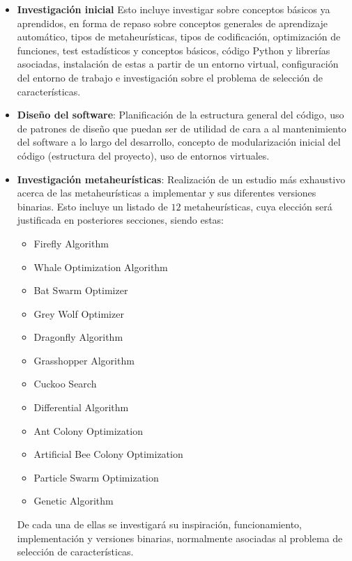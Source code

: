 \begin{itemize}
      \item \textbf{Investigación inicial}
            Esto incluye investigar sobre conceptos básicos ya aprendidos, en forma de repaso sobre conceptos generales de aprendizaje automático, tipos de metaheurísticas, tipos de codificación, optimización de funciones, test estadísticos y conceptos básicos, código Python y librerías asociadas, instalación de estas a partir de un entorno virtual, configuración del entorno de trabajo e investigación sobre el problema de selección de características.

      \item \textbf{Diseño del software}: Planificación de la estructura general del código, uso de patrones de diseño que puedan ser de utilidad de cara a al mantenimiento del software a lo largo del desarrollo, concepto de modularización inicial del código (estructura del proyecto), uso de entornos virtuales.
      \item \textbf{Investigación metaheurísticas}: Realización de un estudio más exhaustivo acerca de las metaheurísticas a implementar y sus diferentes versiones binarias. Esto incluye un listado de $12$ metaheurísticas, cuya elección será justificada en posteriores secciones, siendo estas:
            \begin{itemize}
                  \item Firefly Algorithm
                  \item Whale Optimization Algorithm
                  \item Bat Swarm Optimizer
                  \item Grey Wolf Optimizer
                  \item Dragonfly Algorithm
                  \item Grasshopper Algorithm
                  \item Cuckoo Search
                  \item Differential Algorithm
                  \item Ant Colony Optimization
                  \item Artificial Bee Colony Optimization
                  \item Particle Swarm Optimization
                  \item Genetic Algorithm
            \end{itemize}
            De cada una de ellas se investigará su inspiración, funcionamiento, implementación y versiones binarias, normalmente asociadas al problema de selección de características.

\end{itemize}
